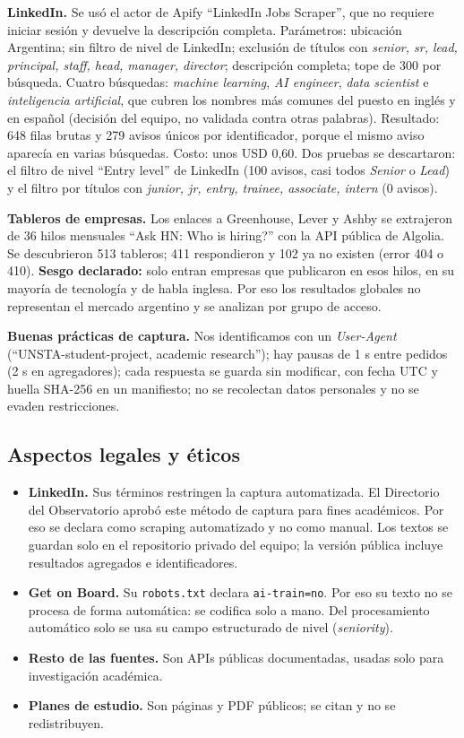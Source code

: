 \documentclass[11pt,a4paper]{article}
\begin{document}
\textbf{LinkedIn.} Se usó el actor de Apify ``LinkedIn Jobs Scraper'', que no requiere iniciar sesión y devuelve la descripción completa. Parámetros: ubicación Argentina; sin filtro de nivel de LinkedIn; exclusión de títulos con \emph{senior, sr, lead, principal, staff, head, manager, director}; descripción completa; tope de 300 por búsqueda. Cuatro búsquedas: \emph{machine learning}, \emph{AI engineer}, \emph{data scientist} e \emph{inteligencia artificial}, que cubren los nombres más comunes del puesto en inglés y en español (decisión del equipo, no validada contra otras palabras). Resultado: 648 filas brutas y 279 avisos únicos por identificador, porque el mismo aviso aparecía en varias búsquedas. Costo: unos USD 0,60. Dos pruebas se descartaron: el filtro de nivel ``Entry level'' de LinkedIn (100 avisos, casi todos \emph{Senior} o \emph{Lead}) y el filtro por títulos con \emph{junior, jr, entry, trainee, associate, intern} (0 avisos).

\textbf{Tableros de empresas.} Los enlaces a Greenhouse, Lever y Ashby se extrajeron de 36 hilos mensuales ``Ask HN: Who is hiring?'' con la API pública de Algolia. Se descubrieron 513 tableros; 411 respondieron y 102 ya no existen (error 404 o 410). \textbf{Sesgo declarado:} solo entran empresas que publicaron en esos hilos, en su mayoría de tecnología y de habla inglesa. Por eso los resultados globales no representan el mercado argentino y se analizan por grupo de acceso.

\textbf{Buenas prácticas de captura.} Nos identificamos con un \emph{User-Agent} (``UNSTA-student-project, academic research''); hay pausas de 1 s entre pedidos (2 s en agregadores); cada respuesta se guarda sin modificar, con fecha UTC y huella SHA-256 en un manifiesto; no se recolectan datos personales y no se evaden restricciones.

\subsection{Aspectos legales y éticos}\label{sec:legal}
\begin{itemize}
\item \textbf{LinkedIn.} Sus términos restringen la captura automatizada. El Directorio del Observatorio aprobó este método de captura para fines académicos. Por eso se declara como scraping automatizado y no como manual. Los textos se guardan solo en el repositorio privado del equipo; la versión pública incluye resultados agregados e identificadores.
\item \textbf{Get on Board.} Su \texttt{robots.txt} declara \texttt{ai-train=no}. Por eso su texto no se procesa de forma automática: se codifica solo a mano. Del procesamiento automático solo se usa su campo estructurado de nivel (\emph{seniority}).
\item \textbf{Resto de las fuentes.} Son APIs públicas documentadas, usadas solo para investigación académica.
\item \textbf{Planes de estudio.} Son páginas y PDF públicos; se citan y no se redistribuyen.
\end{itemize}
\end{document}
